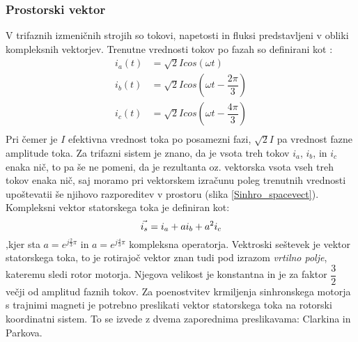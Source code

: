 \documentclass[a4paper,twoside,openright,12pt]{book}
\begin{document}
\subsubsection{Prostorski vektor}
V trifaznih izmeničnih strojih so tokovi, napetosti in fluksi predstavljeni v obliki kompleksnih vektorjev. Trenutne vrednosti tokov po fazah so definirani kot \cite{ambrovzivc1996sodobne}:
\begin{equation}\label{Sinhr_trenutnevred}
	\begin{aligned}
		i_a(t) & = \sqrt{2}Icos(\omega t) \\[5pt]
		i_b(t) & = \sqrt{2}Icos(\omega t - \dfrac{2\pi}{3})\\[5pt]
		i_c(t) & = \sqrt{2}Icos(\omega t - \dfrac{4\pi}{3})\\[5pt]
	\end{aligned}
\end{equation}
Pri čemer je $I$ efektivna vrednost toka po posamezni fazi, $\sqrt{2}I$ pa vrednost fazne amplitude toka. Za trifazni sistem je znano, da je vsota treh tokov $i_a$, $i_b$, in $i_c$ enaka nič, to pa še ne pomeni, da je rezultanta oz. vektorska vsota vseh treh tokov enaka nič, saj moramo pri vektorskem izračunu poleg trenutnih vrednosti upoštevatii še njihovo razporeditev v prostoru (slika \ref{Sinhro_spacevect}). Kompleksni vektor statorskega toka je definiran kot:
\begin{equation}\label{Sinhr_komlstatorskitok}
\vec{i_s}  = i_a + ai_b + a^2i_c \\[5pt]
\end{equation}
,kjer sta  $a=e^{j\frac{2}{3}\pi}$ in  $a=e^{j\frac{4}{3}\pi}$ kompleksna operatorja. Vektroski seštevek je vektor statorskega toka, to je rotirajoč vektor znan tudi pod izrazom \textit{vrtilno polje}, kateremu sledi rotor motorja. Njegova velikost je konstantna in je za faktor $\dfrac{3}{2}$ večji od amplitud faznih tokov. Za poenostvitev krmiljenja sinhronskega motorja s trajnimi magneti je potrebno preslikati vektor statorskega toka na rotorski koordinatni sistem. To se izvede z dvema zaporednima preslikavama: Clarkina in Parkova.
\end{document}
